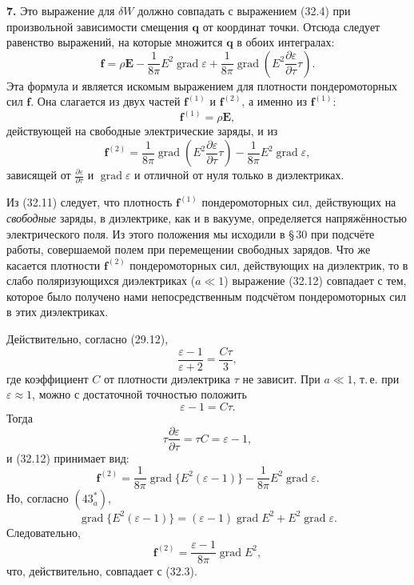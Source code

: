 \documentclass[a4paper,12pt]{article}
\begin{document}
\textbf{7.} Это выражение для $\delta W$ должно совпадать с выражением
(32.4) при произвольной зависимости смещения $\mathbf{q}$ от координат
точки. Отсюда следует равенство выражений, на которые множится
$\mathbf{q}$ в обоих интегралах:
\begin{equation}
    \mathbf{f} = \rho\mathbf{E}
               - \frac{1}{8\pi}E^2\operatorname{grad}\varepsilon
               + \frac{1}{8\pi}\operatorname{grad}\!\left(
                   E^2\frac{\partial\varepsilon}{\partial\tau}\tau
                 \right).
    \tag{32.10}
\end{equation}
Эта формула и является искомым выражением для плотности пондеромоторных
сил $\mathbf{f}$. Она слагается из двух частей $\mathbf{f}^{(1)}$
и $\mathbf{f}^{(2)}$, а именно из $\mathbf{f}^{(1)}$:
\begin{equation}
    \mathbf{f}^{(1)} = \rho\mathbf{E},
    \tag{32.11}
\end{equation}
действующей на свободные электрические заряды, и из
\begin{equation}
    \mathbf{f}^{(2)}
    = \frac{1}{8\pi}\operatorname{grad}\!\left(
        E^2\frac{\partial\varepsilon}{\partial\tau}\tau
      \right)
    - \frac{1}{8\pi}E^2\operatorname{grad}\varepsilon,
    \tag{32.12}
\end{equation}
зависящей от $\frac{\partial\varepsilon}{\partial\tau}$ и
$\operatorname{grad}\varepsilon$ и отличной от нуля только в диэлектриках.


Из (32.11) следует, что плотность $\mathbf{f}^{(1)}$ пондеромоторных
сил, действующих на \textit{свободные} заряды, в диэлектрике, как и
в вакууме, определяется напряжённостью электрического поля. Из этого
положения мы исходили в §\,30 при подсчёте работы, совершаемой полем
при перемещении свободных зарядов. Что же касается плотности
$\mathbf{f}^{(2)}$ пондеромоторных сил, действующих на диэлектрик, то
в слабо поляризующихся диэлектриках ($a \ll 1$) выражение (32.12)
совпадает с тем, которое было получено нами непосредственным подсчётом
пондеромоторных сил в этих диэлектриках.

Действительно, согласно (29.12),
$$
    \frac{\varepsilon-1}{\varepsilon+2} = \frac{C\tau}{3},
$$
где коэффициент $C$ от плотности диэлектрика $\tau$ не зависит. При
$a \ll 1$, т.\,е. при $\varepsilon \approx 1$, можно с достаточной
точностью положить
$$
    \varepsilon - 1 = C\tau.
$$
Тогда
$$
    \tau\frac{\partial\varepsilon}{\partial\tau} = \tau C = \varepsilon - 1,
$$
и (32.12) принимает вид:
$$
    \mathbf{f}^{(2)} = \frac{1}{8\pi}\operatorname{grad}\{E^2(\varepsilon-1)\}
                     - \frac{1}{8\pi}E^2\operatorname{grad}\varepsilon.
$$
Но, согласно $(43^*_a)$,
$$
    \operatorname{grad}\{E^2(\varepsilon-1)\}
    = (\varepsilon-1)\operatorname{grad}E^2 + E^2\operatorname{grad}\varepsilon.
$$
Следовательно,
$$
    \mathbf{f}^{(2)} = \frac{\varepsilon-1}{8\pi}\operatorname{grad}E^2,
$$
что, действительно, совпадает с (32.3).
\end{document}
